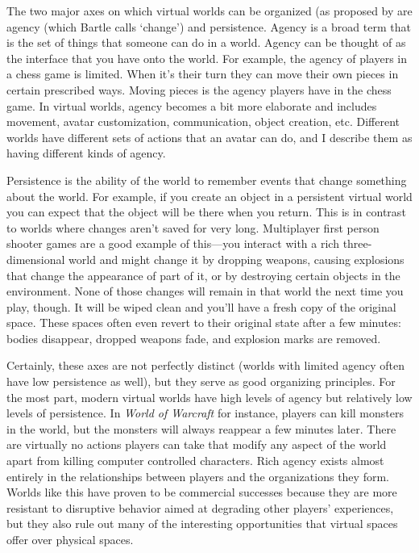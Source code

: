 The two major axes on which virtual worlds can be organized (as proposed by \citet{Bartle:2003up} are agency (which Bartle calls `change') and persistence. Agency is a broad term that is the set of things that someone can do in a world. Agency can be thought of as the interface that you have onto the world. For example, the agency of players in a chess game is limited. When it's their turn they can move their own pieces in certain prescribed ways. Moving pieces is the agency players have in the chess game. In virtual worlds, agency becomes a bit more elaborate and includes movement, avatar customization, communication, object creation, etc. Different worlds have different sets of actions that an avatar can do, and I describe them as having different kinds of agency.

Persistence is the ability of the world to remember events that change something about the world. For example, if you create an object in a persistent virtual world you can expect that the object will be there when you return. This is in contrast to worlds where changes aren't saved for very long. Multiplayer first person shooter games are a good example of this---you interact with a rich three-dimensional world and might change it by dropping weapons, causing explosions that change the appearance of part of it, or by destroying certain objects in the environment. None of those changes will remain in that world the next time you play, though. It will be wiped clean and you'll have a fresh copy of the original space. These spaces often even revert to their original state after a few minutes: bodies disappear, dropped weapons fade, and explosion marks are removed. 

Certainly, these axes are not perfectly distinct (worlds with limited agency often have low persistence as well), but they serve as good organizing principles. For the most part, modern virtual worlds have high levels of agency but relatively low levels of persistence. In \emph{World of Warcraft} for instance, players can kill monsters in the world, but the monsters will always reappear a few minutes later. There are virtually no actions players can take that modify any aspect of the world apart from killing computer controlled characters. Rich agency exists almost entirely in the relationships between players and the organizations they form. Worlds like this have proven to be commercial successes because they are more resistant to disruptive behavior aimed at degrading other players' experiences, but they also rule out many of the interesting opportunities that virtual spaces offer over physical spaces.

